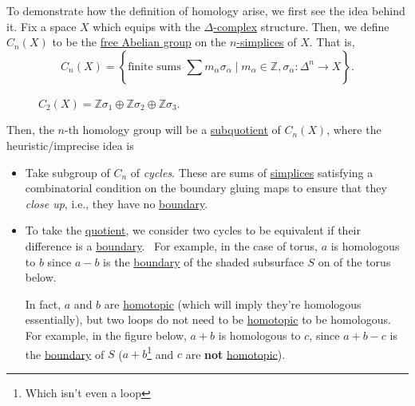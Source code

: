 To demonstrate how the definition of homology arise, we first see the idea behind it. Fix a space \(X\) which equips with the \hyperref[def:delta-complex]{\(\Delta\)-complex}
structure. Then, we define \(C_{n} (X)\) to be the \hyperref[def:free-Abelian-group]{free Abelian group} on the \hyperref[def:standard-simplex]{\(n\)-simplices} of \(X\). That is,
\[
	C_{n} (X) = \left\{\text{finite sums } \sum\limits_{}^{} m_\alpha \sigma _\alpha \mid m_\alpha \in \mathbb{Z} , \sigma _\alpha \colon \Delta ^n\to X\right\}.
\]
\begin{figure}[H]
	\centering
	\caption{\(C_2(X) = \mathbb{Z} \sigma _1 \oplus \mathbb{Z} \sigma _2\oplus \mathbb{Z} \sigma _3\).}
	\label{fig:C2-lec21}
\end{figure}
Then, the \(n\)-th homology group will be a \hyperref[CW-complex-quotient]{subquotient} of \(C_{n} (X)\), where the heuristic/imprecise idea is
\begin{itemize}
	\item Take subgroup of \(C_{n}\) of \emph{cycles}. These are sums of \hyperref[def:standard-simplex]{simplices} satisfying a combinatorial condition
	      on the boundary gluing maps to ensure that they \emph{close up}, i.e., they have no \hyperref[def:boundary]{boundary}.
	      \begin{figure}[H]
		      \centering
		      \label{fig:lec21-demo-of-homology-group}
	      \end{figure}
	\item To take the \hyperref[CW-complex-quotient]{quotient}, we consider two cycles to be equivalent if their difference is a \hyperref[def:boundary]{boundary}. \
	      For example, in the case of torus, \(a\) is homologous to \(b\) since \(a - b\) is the \hyperref[def:boundary]{boundary} of the shaded subsurface \(S\) on
	      of the torus below.
	      \begin{figure}[H]
		      \centering
		      \label{fig:lec21-torus}
	      \end{figure}
	      In fact, \(a\) and \(b\) are \hyperref[def:homotopic]{homotopic} (which will imply they're homologous essentially), but two loops do not
	      need to be \hyperref[def:homotopic]{homotopic} to be homologous. For example, in the figure below, \(a+b\) is homologous to \(c\), since
	      \(a+b-c\) is the \hyperref[def:boundary]{boundary} of \(S\) (\(a+b\)\footnote{Which isn't even a loop} and \(c\) are \textbf{not} \hyperref[def:homotopic]{homotopic}).
	      \begin{figure}[H]
		      \centering
		      \label{fig:lec21-3-torus}
	      \end{figure}
\end{itemize}

